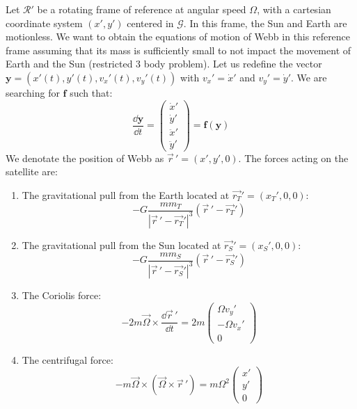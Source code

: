 Let \(\mathcal R'\) be a rotating frame of reference at angular speed \(\Omega\), with a cartesian coordinate system \((x',y')\) centered in \(\mathcal G\). In this frame, the Sun and Earth are motionless. We want to obtain the equations of motion of Webb in this reference frame assuming that its mass is sufficiently small to not impact the movement of Earth and the Sun (restricted 3 body problem). Let us redefine the vector \(\mathbf{y} = (x'(t), y'(t), v_x'(t), v_y'(t))\) with $v_x' = \dot{x}'$ and $v_y' = \dot{y}'$. We are searching for \(\mathbf{f}\) such that:
\begin{equation}
    \frac{\dd \mathbf{y}}{\dd t} = \left(\begin{matrix} \dot x' \\ \dot y' \\ \ddot x' \\ \ddot y' \end{matrix}\right) = \mathbf{f}(\mathbf{y})
\end{equation}
We denotate the position of Webb as \(\vec{r}\,' = (x', y', 0)\). The forces acting on the satellite are:
\begin{enumerate}
    \item The gravitational pull from the Earth located at \(\vec{r_T}' = (x_T', 0, 0)\):
    \begin{equation}
        -G \frac{m m_T}{|\vec{r}\,' - \vec{r_T}'|^3} (\vec{r}\,' - \vec{r_T}')
    \end{equation}
    \item The gravitational pull from the Sun located at \(\vec{r_S}' = (x_S', 0, 0)\):
    \begin{equation}
        -G \frac{m m_S}{|\vec{r}\,' - \vec{r_S}'|^3} (\vec{r}\,' - \vec{r_S}')
    \end{equation}
    \item The Coriolis force:
    \begin{equation}
        -2 m \vec\Omega \times \frac{\dd \vec{r}\,'}{\dd t} = 2 m \left(\begin{matrix} \Omega v_y' \\ -\Omega v_x' \\ 0 \end{matrix}\right)
        \label{eq:coriolis}
    \end{equation}
    \item The centrifugal force:
    \begin{equation}
        -m \vec\Omega \times (\vec\Omega \times \vec{r}\,') = m \Omega^2 \left(\begin{matrix} x' \\ y' \\ 0 \end{matrix}\right)
        \label{eq:centrifugal}
    \end{equation}
\end{enumerate}
